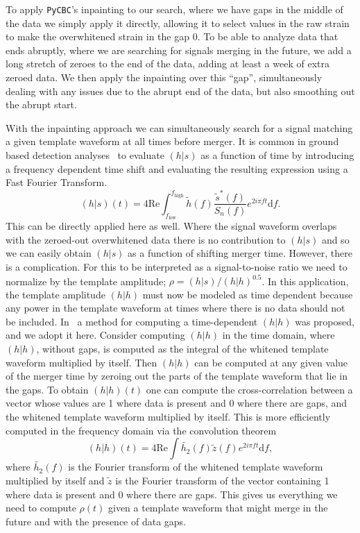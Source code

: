 \documentclass[%
 reprint,
superscriptaddress,
 nofootinbib,
 amsmath,amssymb,
 aps,
 prd,
]{revtex4-2}
\newcommand{\deleted}[1]{}
\begin{document}
To apply \texttt{PyCBC}'s inpainting to our search, where we have gaps in the middle of the data we simply apply it directly, allowing it to select values in the raw strain to make the overwhitened strain in the gap 0.
To be able to analyze data that ends abruptly, where we are searching for signals merging in the future, we add a long stretch of zeroes to the end of the data, adding at least a week of extra zeroed data.
We then apply the inpainting over this ``gap'', simultaneously dealing with any issues due to the abrupt end of the data, but also smoothing out the abrupt start.

With the inpainting approach we can simultaneously search for a signal matching a given template waveform at all times before merger.
It is common in ground based detection analyses~\cite{Allen:2005fk} to evaluate $(h|s)$ as a function of time by introducing a frequency dependent time shift and evaluating the resulting expression using a Fast Fourier Transform.
%
\begin{equation}
    (h|s)(t) = 4\mathrm{Re}\int_{f_\mathrm{low}}^{f_\mathrm{high}} \tilde{h}(f) \frac{\tilde{s}^*(f)}{S_n(f)} e^{2 i \pi f t} \mathrm{d} f.
\end{equation}
%
This can be directly applied here as well. Where the signal waveform overlaps with the zeroed-out
overwhitened data there is no contribution to $(h|s)$ and so we can easily obtain $(h|s)$ as a function of shifting merger time.
However, there is a complication. For this to be interpreted as a signal-to-noise ratio we need to normalize by the template amplitude; $\rho = (h|s) / (h|h)^{0.5}$.
In this application, the template amplitude $(h|h)$ must now be modeled as time dependent because any power in the template waveform at times where there is no data should not be included.
In~\cite{Zackay:2019kkv} a method for computing a time-dependent $(h|h)$ was proposed, and we adopt it here.
Consider computing $(h|h)$ in the time domain, where $(h|h)$, without gaps, is computed as the integral of the whitened template waveform multiplied by itself.
Then $(h|h)$ can be computed at any given value of the merger time by zeroing out the parts of the template waveform that lie in the gaps.
To obtain $(h|h)(t)$ one can compute the cross-correlation between a vector whose values are 1 where data is present and 0 where there are gaps, and the whitened template waveform multiplied by itself.
This is more efficiently computed in the frequency domain via the convolution theorem
%
\begin{equation}
    (h|h)(t) = 4\mathrm{Re}\int \tilde{h_2}(f) \tilde{z}(f) e^{2 i \pi f t} \mathrm{d} f,
\end{equation}
%
where $\tilde{h_2}(f)$ is the Fourier transform of the whitened template waveform multiplied by itself and $\tilde{z}$ is the Fourier transform
of the vector containing 1 where data is present and 0 where there are gaps.
This gives us everything we need to compute $\rho(t)$ given a template waveform that might merge in the future and with the presence of data gaps.
\end{document}

